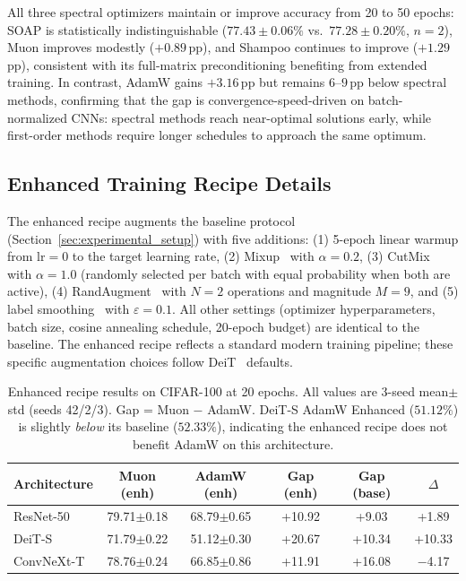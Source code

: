 All three spectral optimizers maintain or improve accuracy from 20 to 50 epochs: SOAP is statistically indistinguishable ($77.43{\pm}0.06\%$ vs.\ $77.28{\pm}0.20\%$, $n{=}2$), Muon improves modestly ($+0.89$\,pp), and Shampoo continues to improve ($+1.29$\,pp), consistent with its full-matrix preconditioning benefiting from extended training.
In contrast, AdamW gains $+3.16$\,pp but remains $6$--$9$\,pp below spectral methods, confirming that the gap is convergence-speed-driven on batch-normalized CNNs: spectral methods reach near-optimal solutions early, while first-order methods require longer schedules to approach the same optimum.

\subsection{Enhanced Training Recipe Details}
\label{sec:enhanced_recipe_details}

The enhanced recipe augments the baseline protocol (Section~\ref{sec:experimental_setup}) with five additions: (1) 5-epoch linear warmup from $\text{lr}=0$ to the target learning rate, (2) Mixup~\cite{zhang2018mixup} with $\alpha=0.2$, (3) CutMix~\cite{yun2019cutmix} with $\alpha=1.0$ (randomly selected per batch with equal probability when both are active), (4) RandAugment~\cite{cubuk2020randaugment} with $N=2$ operations and magnitude $M=9$, and (5) label smoothing~\cite{szegedy2016rethinking} with $\varepsilon=0.1$.
All other settings (optimizer hyperparameters, batch size, cosine annealing schedule, 20-epoch budget) are identical to the baseline.
The enhanced recipe reflects a standard modern training pipeline; these specific augmentation choices follow DeiT~\cite{touvron2021training} defaults.

\begin{table}[h]
\centering
\caption{Enhanced recipe results on CIFAR-100 at 20 epochs. All values are 3-seed mean$\pm$std (seeds 42/2/3). Gap = Muon $-$ AdamW. DeiT-S AdamW Enhanced ($51.12\%$) is slightly \emph{below} its baseline ($52.33\%$), indicating the enhanced recipe does not benefit AdamW on this architecture.}
\label{tab:enhanced_recipe}
\vspace{-0.5em}
\small
\begin{tabular}{@{}lccccc@{}}
\toprule
Architecture & Muon (enh) & AdamW (enh) & Gap (enh) & Gap (base) & $\Delta$ \\
\midrule
ResNet-50 & 79.71{\scriptsize$\pm$0.18} & 68.79{\scriptsize$\pm$0.65} & +10.92 & +9.03 & +1.89 \\
DeiT-S & 71.79{\scriptsize$\pm$0.22} & 51.12{\scriptsize$\pm$0.30} & +20.67 & +10.34 & +10.33 \\
ConvNeXt-T & 78.76{\scriptsize$\pm$0.24} & 66.85{\scriptsize$\pm$0.86} & +11.91 & +16.08 & $-$4.17 \\
\bottomrule
\end{tabular}
\vspace{-0.5em}
\end{table}
